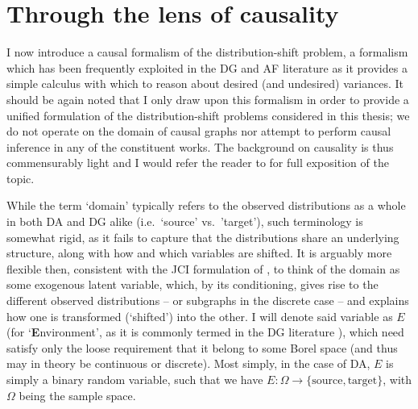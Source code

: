 \section{Through the lens of causality}\label{sec:lens-of-causality}
I now introduce a causal formalism of the distribution-shift problem, a formalism which has been
frequently exploited in the \ac{DG} and \ac{AF} literature as it provides a simple calculus with
which to reason about desired (and undesired) variances.
%
It should be again noted that I only draw upon this formalism in order to provide a unified
formulation of the distribution-shift problems considered in this thesis; we do not operate on the
domain of causal graphs nor attempt to perform causal inference in any of the constituent works. 
%
The background on causality is thus commensurably light and I would refer the reader to
\citet{pearl2009causality} for full exposition of the topic.

While the term `domain' typically refers to the observed distributions as a whole in both \ac{DA}
and \ac{DG} alike (i.e.\ `source' vs.\ 'target'), such terminology is somewhat rigid, as it fails
to capture that the distributions share an underlying structure, along with how and which variables
are shifted.
%
%
It is arguably more flexible then, consistent with the JCI formulation of \citet{mooij2020joint}, to
think of the domain as some exogenous latent variable, which, by its conditioning, gives rise to
the different observed distributions -- or subgraphs in the discrete case -- and explains how one
is transformed (`shifted') into the other.
%
I will denote said variable as \(E\) (for `\textbf{E}nvironment', as it is commonly termed in the
\ac{DG} literature \citep{arjovsky2019invariant}), which need satisfy only the loose requirement that it
belong to some Borel space (and thus may in theory be continuous or discrete).
%
Most simply, in the case of \ac{DA}, \(E\) is simply a binary random variable, such that we have \(E:
\Omega \to \{ \text{source}, \text{target} \}\), with \( \Omega \) being the sample space.
%

